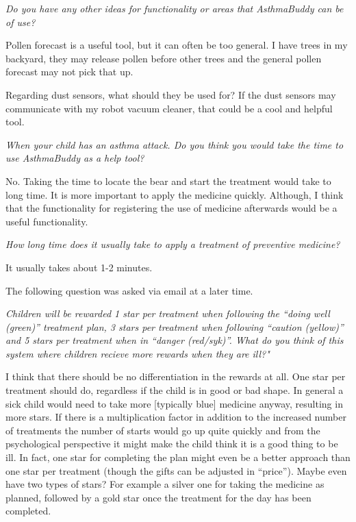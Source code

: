 \emph{Do you have any other ideas for functionality or areas that AsthmaBuddy can be of use?}

Pollen forecast is a useful tool, but it can often be too general. I have trees in my backyard, they may release pollen before other trees and the general pollen forecast may not pick that up. 

Regarding dust sensors, what should they be used for? If the dust sensors may communicate with my robot vacuum cleaner, that could be a cool and helpful tool. 


\emph{When your child has an asthma attack. Do you think you would take the time to use AsthmaBuddy as a help tool?}

No. Taking the time to locate the bear and start the treatment would take to long time. It is more important to apply the medicine quickly. Although, I think that the functionality for registering the use of medicine afterwards would be a useful functionality.

\emph{How long time does it usually take to apply a treatment of preventive medicine?}

It usually takes about 1-2 minutes. 


The following question was asked via email at a later time.

\emph{Children will be rewarded 1 star per treatment when following the ``doing well (green)'' treatment plan, 3 stars per treatment when following ``caution (yellow)'' and 5 stars per treatment when in ``danger (red/syk)''. What do you think of this system where children recieve more rewards when they are ill?"}

I think that there should be no differentiation in the rewards at all. One star per treatment should do, regardless if the child is in good or bad shape. In general a sick child would need to take more [typically blue] medicine anyway, resulting in more stars.  
If there is a multiplication factor in addition to the increased number of treatments the number of starts would go up quite quickly and from the psychological perspective it might make the child think it is a good thing to be ill. In fact, one star for completing the plan might even be a better approach than one star per treatment (though the gifts can be adjusted in ``price''). Maybe even have two types of stars? For example a silver one for taking the medicine as planned, followed by a gold star once the treatment for the day has been completed.
